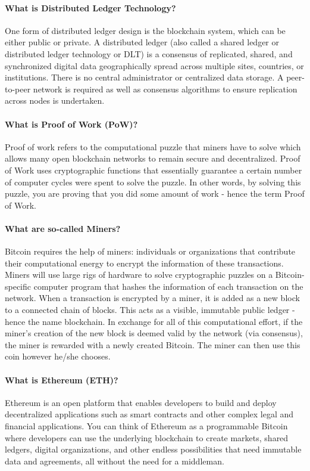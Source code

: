\paragraph{What is Distributed Ledger Technology?} One form of distributed ledger design is the blockchain system, which can be either public or private. A distributed ledger (also called a shared ledger or distributed ledger technology or DLT) is a consensus of replicated, shared, and synchronized digital data geographically spread across multiple sites, countries, or institutions. There is no central administrator or centralized data storage. A peer-to-peer network is required as well as consensus algorithms to ensure replication across nodes is undertaken. 

\paragraph{What is Proof of Work (PoW)?} Proof of work refers to the computational puzzle that miners have to solve which allows many open blockchain networks to remain secure and decentralized. Proof of Work uses cryptographic functions that essentially guarantee a certain number of computer cycles were spent to solve the puzzle. In other words, by solving this puzzle, you are proving that you did some amount of work - hence the term Proof of Work. 

\paragraph{What are so-called Miners?} Bitcoin requires the help of miners: individuals or organizations that contribute their computational energy to encrypt the information of these transactions. Miners will use large rigs of hardware to solve cryptographic puzzles on a Bitcoin-specific computer program that hashes the information of each transaction on the network. When a transaction is encrypted by a miner, it is added as a new block to a connected chain of blocks. This acts as a visible, immutable public ledger - hence the name blockchain. In exchange for all of this computational effort, if the miner's creation of the new block is deemed valid by the network (via consensus), the miner is rewarded with a newly created Bitcoin. The miner can then use this coin however he/she chooses.

\paragraph{What is Ethereum (ETH)?} Ethereum is an open platform that enables developers to build and deploy decentralized applications such as smart contracts and other complex legal and financial applications. You can think of Ethereum as a programmable Bitcoin where developers can use the underlying blockchain to create markets, shared ledgers, digital organizations, and other endless possibilities that need immutable data and agreements, all without the need for a middleman.

